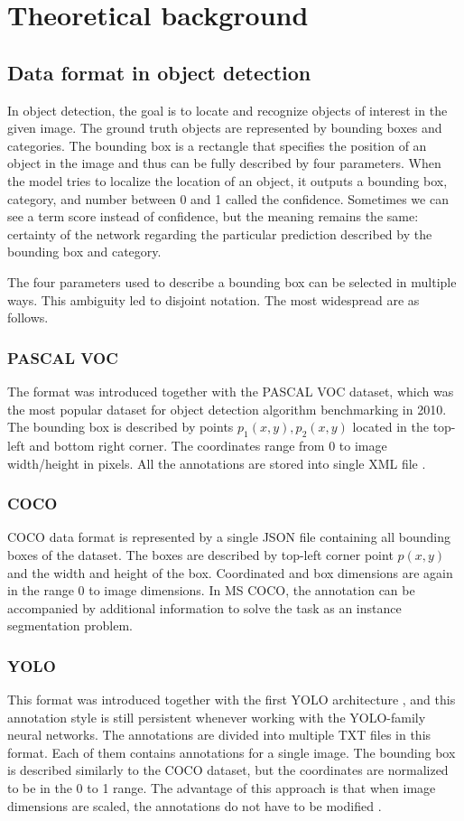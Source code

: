 \chapter{Theoretical background}
\section{Data format in object detection}
In object detection, the goal is to locate and recognize objects of interest in the given image. The ground truth objects are represented by bounding boxes and categories. The bounding box is a rectangle that specifies the position of an object in the image and thus can be fully described by four parameters. When the model tries to localize the location of an object, it outputs a bounding box, category, and number between 0 and 1 called the confidence. Sometimes we can see a term score instead of confidence, but the meaning remains the same: certainty of the network regarding the particular prediction described by the bounding box and category.

The four parameters used to describe a bounding box can be selected in multiple ways. This ambiguity led to disjoint notation. The most widespread are as follows.
\subsection{PASCAL VOC}
The format was introduced together with the PASCAL VOC dataset, which was the most popular dataset for object detection algorithm benchmarking in 2010. The bounding box is described by points $p_1(x,y),p_2(x,y)$ located in the top-left and bottom right corner. The coordinates range from 0 to image width/height in pixels. All the annotations are stored into single XML file \cite{Everingham2009,Padilla2021}.
\subsection{COCO}
COCO data format is represented by a single JSON file containing all bounding boxes of the dataset. The boxes are described by top-left corner point $p(x,y)$ and the width and height of the box. Coordinated and box dimensions are again in the range 0 to image dimensions. In MS COCO, the annotation can be accompanied by additional information to solve the task as an instance segmentation problem.
\subsection{YOLO}
This format was introduced together with the first YOLO architecture \cite{Redmon2015}, and this annotation style is still persistent whenever working with the YOLO-family neural networks.
The annotations are divided into multiple TXT files in this format. Each of them contains annotations for a single image.
The bounding box is described similarly to the COCO dataset, but the coordinates are normalized to be in the 0 to 1 range. The advantage of this approach is that when image dimensions are scaled, the annotations do not have to be modified \cite{Redmon2015,Padilla2021}.


